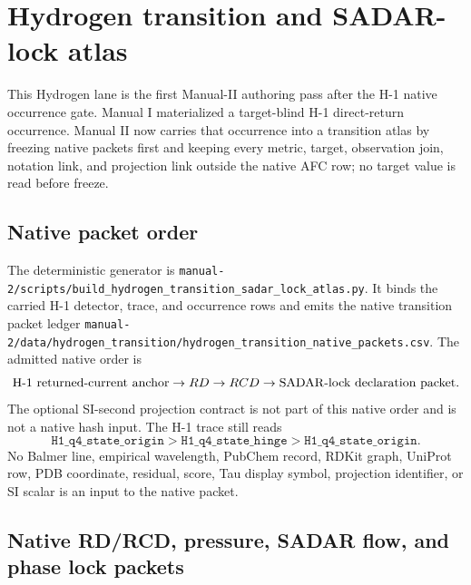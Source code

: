 \section{Hydrogen transition and SADAR-lock atlas}
\label{sec:manual2-hydrogen-transition-sadar-lock-atlas}

This Hydrogen lane is the first Manual-II authoring pass after the H-1 native
occurrence gate.  Manual I materialized a target-blind H-1 direct-return
occurrence.  Manual II now carries that occurrence into a transition atlas by
freezing native packets first and keeping every metric, target, observation
join, notation link, and projection link outside the native AFC row; no target value is read before freeze.


\subsection{Native packet order}

The deterministic generator is
\texttt{manual-2/scripts/build\_hydrogen\_transition\_sadar\_lock\_atlas.py}.
It binds the carried H-1 detector, trace, and occurrence rows and emits the
native transition packet ledger
\texttt{manual-2/data/hydrogen\_transition/hydrogen\_transition\_native\_packets.csv}.
The admitted native order is
\[
\text{H-1 returned-current anchor}
\to
RD
\to
RCD
\to
\mathrm{SADAR}\text{-lock declaration packet}.
\]
The optional SI-second projection contract is not part of this native order and
is not a native hash input.  The H-1 trace still reads
\[
\mathtt{H1\_q4\_state\_origin}
>
\mathtt{H1\_q4\_state\_hinge}
>
\mathtt{H1\_q4\_state\_origin}.
\]
No Balmer line, empirical wavelength, PubChem record, RDKit graph, UniProt row,
PDB coordinate, residual, score, Tau display symbol, projection identifier, or
SI scalar is an input to the native packet.


\subsection{Native RD/RCD, pressure, SADAR flow, and phase lock packets}

